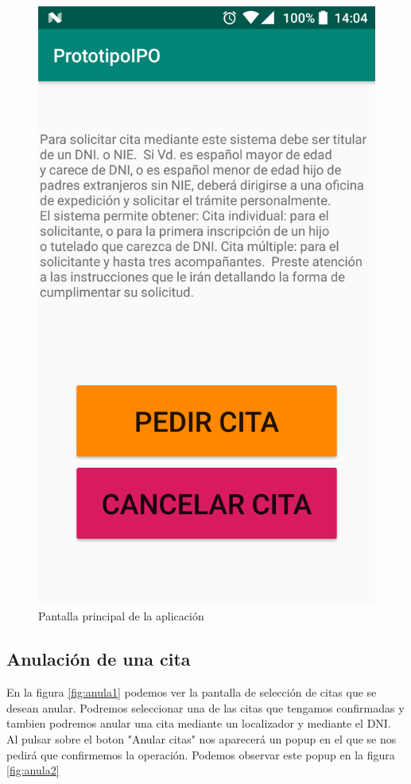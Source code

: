 \documentclass[a4paper,11pt]{article}
\begin{document}
\begin{figure}[H]
  \centering
  \includegraphics[scale=0.2]{1.png}
  \caption{Pantalla principal de la aplicación}
  \label{fig:pantallainicial}
\end{figure}


\subsection{Anulación de una cita}
En la figura \ref{fig:anula1} podemos ver la pantalla de selección de citas que se desean anular. Podremos seleccionar una de las citas que tengamos confirmadas y tambien podremos anular una cita mediante un localizador y mediante el DNI.\\
Al pulsar sobre el boton "Anular citas" nos aparecerá un popup en el que se nos pedirá que confirmemos la operación. Podemos observar este popup en la figura \ref{fig:anula2}
\end{document}

